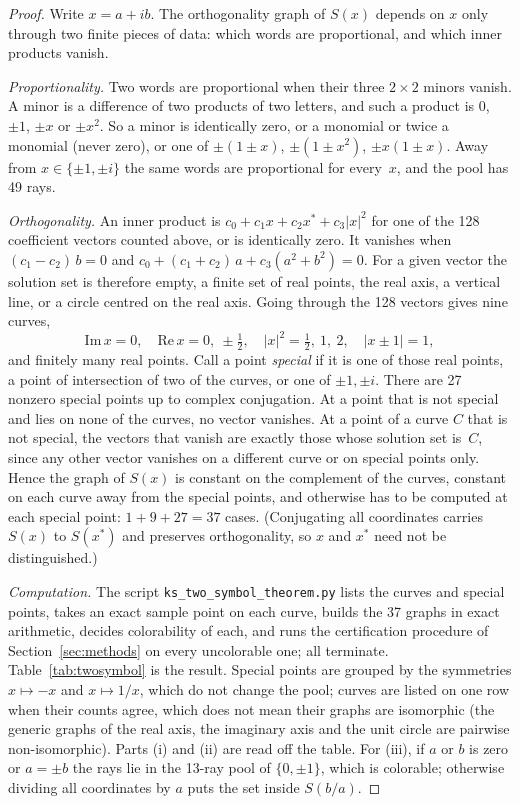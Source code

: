 \begin{proof}
Write $x=a+ib$.  The orthogonality graph of $S(x)$ depends on $x$ only through two finite pieces
of data: which words are proportional, and which inner products vanish.

\emph{Proportionality.}  Two words are proportional when their three $2\times2$ minors vanish.
A minor is a difference of two products of two letters, and such a product is $0$, $\pm1$, $\pm x$ or $\pm x^2$.  So a minor is identically zero, or a
monomial or twice a monomial (never zero), or one of $\pm(1\pm x)$, $\pm(1\pm x^2)$,
$\pm x(1\pm x)$.  Away from $x\in\{\pm1,\pm i\}$
the same words are proportional for every~$x$, and the pool has 49 rays.

\emph{Orthogonality.}  An inner product is $c_0+c_1x+c_2x^{*}+c_3|x|^2$ for one of the 128
coefficient vectors counted above, or is identically zero.  It vanishes when
$(c_1-c_2)\,b=0$ and $c_0+(c_1+c_2)\,a+c_3(a^2+b^2)=0$.  For a given vector the solution set is
therefore empty, a finite set of real points, the real axis, a vertical line, or a circle
centred on the real axis.  Going through the 128 vectors gives nine curves,
\[
\mathrm{Im}\,x=0,\quad \mathrm{Re}\,x=0,\ \pm\tfrac12,\quad |x|^2=\tfrac12,\ 1,\ 2,\quad
|x\pm1|=1,
\]
and finitely many real points.  Call a point \emph{special} if it is one of those real points, a
point of intersection of two of the curves, or one of $\pm1,\pm i$.  There are 27 nonzero special points
up to complex conjugation.  At a point that is not special and lies on none of the curves, no
vector vanishes.  At a point of a curve $C$ that is not special, the vectors that vanish are
exactly those whose solution set is~$C$, since any other vector vanishes on a different curve or
on special points only.  Hence the graph of $S(x)$ is constant on the complement of the curves,
constant on each curve away from the special points, and otherwise has to be computed at each
special point: $1+9+27=37$ cases.  (Conjugating all coordinates carries $S(x)$ to $S(x^{*})$ and
preserves orthogonality, so $x$ and $x^{*}$ need not be distinguished.)

\emph{Computation.}  The script \texttt{ks\_two\_symbol\_theorem.py} lists the curves and special
points, takes an exact sample point on each curve, builds the 37 graphs in exact arithmetic, decides colorability of each, and runs the certification procedure of
Section~\ref{sec:methods} on every uncolorable one; all terminate.
Table~\ref{tab:twosymbol} is the result.  Special points are grouped by the symmetries $x\mapsto-x$
and $x\mapsto1/x$, which do not change the pool; curves are listed on one row when their counts
agree, which does not mean their graphs are isomorphic (the generic graphs of the real axis, the
imaginary axis and the unit circle are pairwise non-isomorphic).  Parts (i) and (ii) are read off the table.  For
(iii), if $a$ or $b$ is zero or $a=\pm b$ the rays lie in the 13-ray pool of $\{0,\pm1\}$, which
is colorable; otherwise dividing all coordinates by $a$ puts the set inside $S(b/a)$.
\end{proof}

